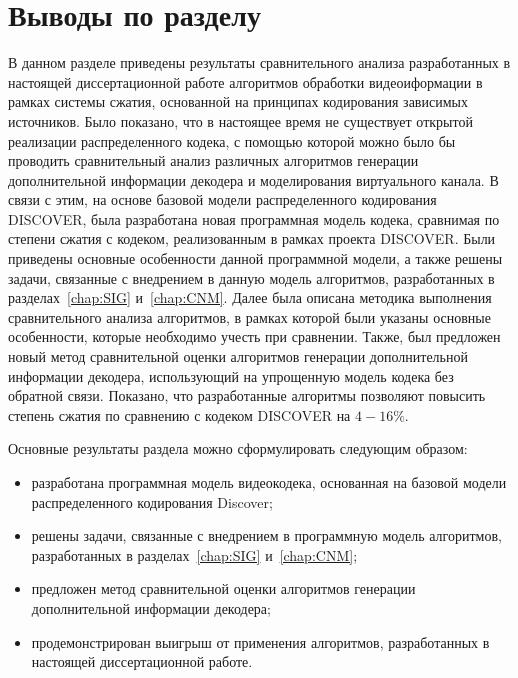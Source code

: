 \section{Выводы по разделу}
\label{chap:ExpResults:Conclusion}

В данном разделе приведены результаты сравнительного анализа разработанных в настоящей диссертационной работе алгоритмов обработки видеоиформации в рамках системы сжатия, основанной на принципах кодирования зависимых источников. Было показано, что в настоящее время не существует открытой реализации распределенного кодека, с помощью которой можно было бы проводить сравнительный анализ различных алгоритмов генерации дополнительной информации декодера и моделирования виртуального канала. В связи с этим, на основе базовой модели распределенного кодирования DISCOVER, была разработана новая программная модель кодека, сравнимая по степени сжатия с кодеком, реализованным в рамках проекта DISCOVER. Были приведены основные особенности данной программной модели, а также решены задачи, связанные с внедрением в данную модель алгоритмов, разработанных в разделах~\ref{chap:SIG} и~\ref{chap:CNM}. Далее была описана методика выполнения сравнительного анализа алгоритмов, в рамках которой были указаны основные особенности, которые необходимо учесть при сравнении. Также, был предложен новый метод сравнительной оценки алгоритмов генерации дополнительной информации декодера, использующий на упрощенную модель кодека без обратной связи. Показано, что разработанные алгоритмы позволяют повысить степень сжатия по сравнению с кодеком DISCOVER на $4-16\%$.

Основные результаты раздела можно сформулировать следующим образом:
\begin{itemize}
    \item разработана программная модель видеокодека, основанная на базовой модели распределенного кодирования Discover;
    \item решены задачи, связанные с внедрением в программную модель алгоритмов, разработанных в разделах~\ref{chap:SIG} и~\ref{chap:CNM};
    \item предложен метод сравнительной оценки алгоритмов генерации дополнительной информации декодера;
    \item продемонстрирован выигрыш от применения алгоритмов, разработанных в настоящей диссертационной работе.
\end{itemize}